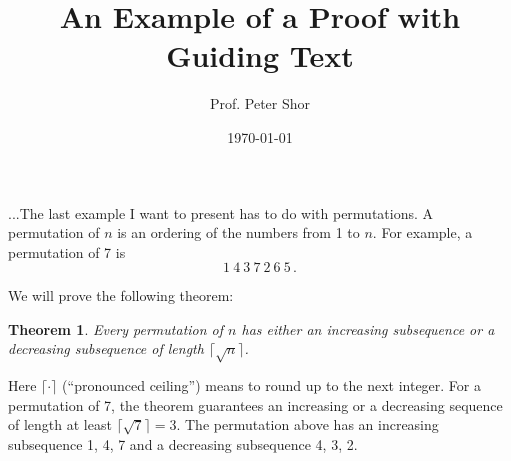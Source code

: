 \documentclass[11pt]{article}
\title{An Example of a Proof with Guiding Text}
\author{Prof. Peter Shor}
\date{\today}
\theoremstyle{plain}
\newtheorem{theorem}{Theorem}
\theoremstyle{definition}
\theoremstyle{remark}
\begin{document}
\maketitle

...The last example I want to present has 
to do with permutations. A permutation of $n$ is an ordering of the numbers from 1 to $n$. 
For example, a permutation of 7 is
\[
1 \ 4 \ 3 \ 7 \ 2 \ 6 \ 5 \, .
\]

We will prove the following theorem:
\begin{theorem}
 Every permutation of $n$  has either an
increasing subsequence or a decreasing subsequence of length $\lceil \sqrt{n}
\rceil$. 
\end{theorem}

Here $\lceil \cdot \rceil$ (``pronounced ceiling'') means to round up
to the next integer.  For a permutation of 7, the theorem guarantees an increasing or a
decreasing sequence of length at least $\lceil \sqrt{7} \rceil = 3$. The permutation 
above has an increasing subsequence 1, 4, 7 and a decreasing subsequence 4, 3, 2. 
\end{document}
